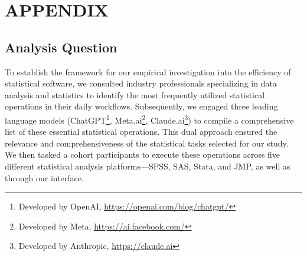 \documentclass{article}
\begin{document}



 
\appendix
\section{APPENDIX}
\subsection{Analysis Question}  
To establish the framework for our empirical investigation into the efficiency of statistical software, we consulted industry professionals specializing in data analysis and statistics to identify the most frequently utilized statistical operations in their daily workflows. Subsequently, we engaged three leading language models (ChatGPT\footnote{Developed by OpenAI, \url{https://openai.com/blog/chatgpt/}}, Meta.ai\footnote{Developed by Meta, \url{https://ai.facebook.com/}}, Claude.ai\footnote{Developed by Anthropic, \url{https://claude.ai}}) to compile a comprehensive list of these essential statistical operations. This dual approach ensured the relevance and comprehensiveness of the statistical tasks selected for our study. We then tasked a cohort participants to execute these operations across five different statistical analysis platforms—SPSS, SAS, Stata, and JMP, as well as through our interface. 
\end{document}
